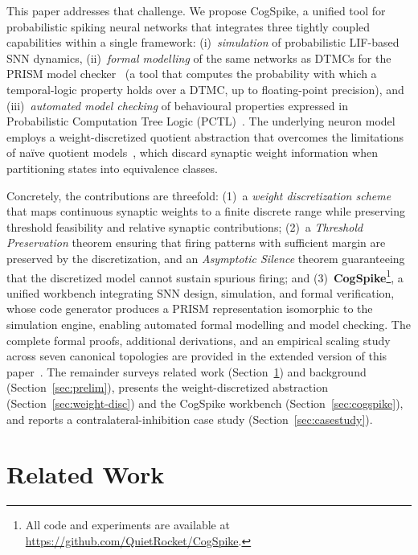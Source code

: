 \documentclass[runningheads]{llncs}
\begin{document}
This paper addresses that challenge. We propose CogSpike, a unified tool for
probabilistic spiking neural networks that integrates three tightly coupled
capabilities within a single framework: (i)~\emph{simulation} of probabilistic
LIF-based SNN dynamics, (ii)~\emph{formal modelling} of the same networks as
DTMCs for the PRISM model checker~\cite{PRISM2011} (a tool that computes the
probability with which a temporal-logic property holds over a DTMC, up to
floating-point precision), and (iii)~\emph{automated model checking} of
behavioural properties expressed in Probabilistic Computation Tree Logic
(PCTL)~\cite{hansson1994logic}. The underlying neuron model employs a
weight-discretized quotient abstraction that overcomes the limitations of naïve
quotient models~\cite{BaierKatoen2008}, which discard synaptic weight
information when partitioning states into equivalence classes.

Concretely, the contributions are threefold:
(1)~a \emph{weight discretization scheme} that maps continuous synaptic weights
to a finite discrete range while preserving threshold feasibility and relative
synaptic contributions;
(2)~a \emph{Threshold Preservation} theorem ensuring that firing patterns with
sufficient margin are preserved by the discretization, and an \emph{Asymptotic
Silence} theorem guaranteeing that the discretized model cannot sustain spurious
firing; and
(3)~\textbf{CogSpike}\footnote{All code and experiments are available at
\url{https://github.com/QuietRocket/CogSpike}.}, a unified workbench integrating
SNN design, simulation, and formal verification, whose code generator produces a
PRISM representation isomorphic to the simulation engine, enabling automated
formal modelling and model checking. The complete formal proofs, additional
derivations, and an empirical scaling study across seven canonical topologies
are provided in the extended version of this paper~\cite{cogspikeExtended}.
The remainder surveys related work (Section~\ref{sec:related}) and background
(Section~\ref{sec:prelim}), presents the weight-discretized abstraction
(Section~\ref{sec:weight-disc}) and the CogSpike workbench
(Section~\ref{sec:cogspike}), and reports a contralateral-inhibition case study
(Section~\ref{sec:casestudy}).


\section{Related Work}\label{sec:related}
\end{document}
